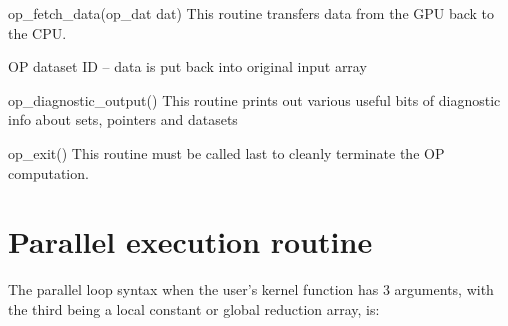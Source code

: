 \begin{routine} {op\_fetch\_data(op\_dat dat)}
{This routine transfers data from the GPU back to the CPU.}
\item[dat]           OP dataset ID -- data is put back into original input array 
\end{routine}


\begin{routine} {op\_diagnostic\_output()}
{This routine prints out various useful bits of diagnostic info about sets, pointers and datasets}
\item \vspace{-0.3in}
\end{routine}


\begin{routine} {op\_exit()}
{This routine must be called last to cleanly terminate the OP computation.}
\item \vspace{-0.3in}
\end{routine}



\newpage
\section{Parallel execution routine}

The parallel loop syntax when the user's kernel function has 3 arguments,
with the third being a local constant or global reduction array, is:


